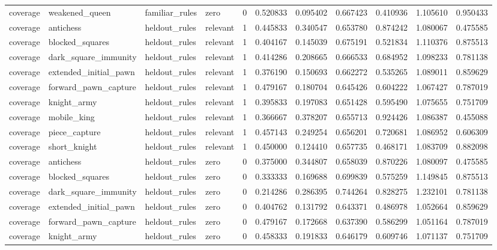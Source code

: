 \begin{tabular}{lllllllllll}
coverage & weakened\_queen & familiar\_rules & zero & 0 & 0.520833 & 0.095402 & 0.667423 & 0.410936 & 1.105610 & 0.950433 \\
coverage & antichess & heldout\_rules & relevant & 1 & 0.445833 & 0.340547 & 0.653780 & 0.874242 & 1.080067 & 0.475585 \\
coverage & blocked\_squares & heldout\_rules & relevant & 1 & 0.404167 & 0.145039 & 0.675191 & 0.521834 & 1.110376 & 0.875513 \\
coverage & dark\_square\_immunity & heldout\_rules & relevant & 1 & 0.414286 & 0.208665 & 0.666533 & 0.684952 & 1.098233 & 0.781138 \\
coverage & extended\_initial\_pawn & heldout\_rules & relevant & 1 & 0.376190 & 0.150693 & 0.662272 & 0.535265 & 1.089011 & 0.859629 \\
coverage & forward\_pawn\_capture & heldout\_rules & relevant & 1 & 0.479167 & 0.180704 & 0.645426 & 0.604222 & 1.067427 & 0.787019 \\
coverage & knight\_army & heldout\_rules & relevant & 1 & 0.395833 & 0.197083 & 0.651428 & 0.595490 & 1.075655 & 0.751709 \\
coverage & mobile\_king & heldout\_rules & relevant & 1 & 0.366667 & 0.378207 & 0.655713 & 0.924426 & 1.086387 & 0.455088 \\
coverage & piece\_capture & heldout\_rules & relevant & 1 & 0.457143 & 0.249254 & 0.656201 & 0.720681 & 1.086952 & 0.606309 \\
coverage & short\_knight & heldout\_rules & relevant & 1 & 0.450000 & 0.124410 & 0.657735 & 0.468171 & 1.083709 & 0.882098 \\
coverage & antichess & heldout\_rules & zero & 0 & 0.375000 & 0.344807 & 0.658039 & 0.870226 & 1.080097 & 0.475585 \\
coverage & blocked\_squares & heldout\_rules & zero & 0 & 0.333333 & 0.169688 & 0.699839 & 0.575259 & 1.149845 & 0.875513 \\
coverage & dark\_square\_immunity & heldout\_rules & zero & 0 & 0.214286 & 0.286395 & 0.744264 & 0.828275 & 1.232101 & 0.781138 \\
coverage & extended\_initial\_pawn & heldout\_rules & zero & 0 & 0.404762 & 0.131792 & 0.643371 & 0.486978 & 1.052664 & 0.859629 \\
coverage & forward\_pawn\_capture & heldout\_rules & zero & 0 & 0.479167 & 0.172668 & 0.637390 & 0.586299 & 1.051164 & 0.787019 \\
coverage & knight\_army & heldout\_rules & zero & 0 & 0.458333 & 0.191833 & 0.646179 & 0.609746 & 1.071137 & 0.751709 \\

\end{tabular}
